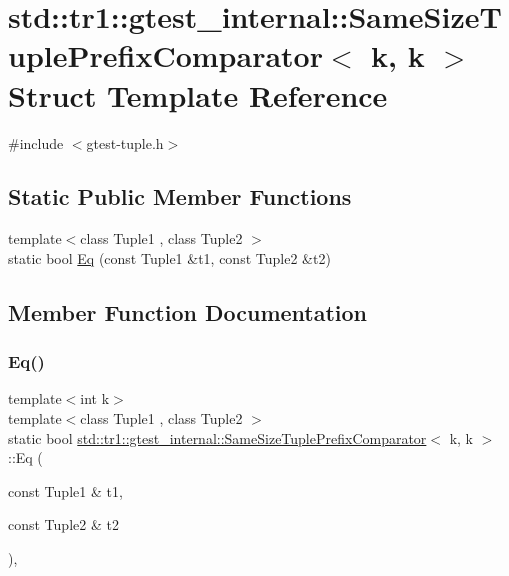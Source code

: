 \hypertarget{structstd_1_1tr1_1_1gtest__internal_1_1_same_size_tuple_prefix_comparator_3_01k_00_01k_01_4}{}\section{std\+::tr1\+::gtest\+\_\+internal\+::Same\+Size\+Tuple\+Prefix\+Comparator$<$ k, k $>$ Struct Template Reference}
\label{structstd_1_1tr1_1_1gtest__internal_1_1_same_size_tuple_prefix_comparator_3_01k_00_01k_01_4}


{\ttfamily \#include $<$gtest-\/tuple.\+h$>$}

\subsection*{Static Public Member Functions}
\begin{DoxyCompactItemize}
\item 
{\footnotesize template$<$class Tuple1 , class Tuple2 $>$ }\\static bool \mbox{\hyperlink{structstd_1_1tr1_1_1gtest__internal_1_1_same_size_tuple_prefix_comparator_3_01k_00_01k_01_4_a5564fbade05a2d0522d9899da62c2119}{Eq}} (const Tuple1 \&t1, const Tuple2 \&t2)
\end{DoxyCompactItemize}


\subsection{Member Function Documentation}
\mbox{\label{structstd_1_1tr1_1_1gtest__internal_1_1_same_size_tuple_prefix_comparator_3_01k_00_01k_01_4_a5564fbade05a2d0522d9899da62c2119}} 
\subsubsection{\texorpdfstring{Eq()}{Eq()}}
{\footnotesize\ttfamily template$<$int k$>$ \\
template$<$class Tuple1 , class Tuple2 $>$ \\
static bool \mbox{\hyperlink{structstd_1_1tr1_1_1gtest__internal_1_1_same_size_tuple_prefix_comparator}{std\+::tr1\+::gtest\+\_\+internal\+::\+Same\+Size\+Tuple\+Prefix\+Comparator}}$<$ k, k $>$\+::Eq (\begin{DoxyParamCaption}\item[{const Tuple1 \&}]{t1,  }\item[{const Tuple2 \&}]{t2 }\end{DoxyParamCaption})\hspace{0.3cm}{\ttfamily [inline]}, {\ttfamily [static]}}



